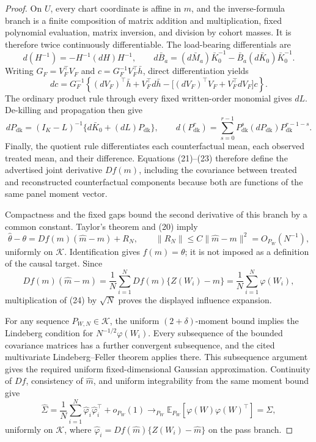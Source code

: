 \documentclass{article}
\begin{document}
\begin{proof}
On \(U\), every chart coordinate is affine in \(m\), and the inverse-formula branch is a finite composition of matrix addition and multiplication, fixed polynomial evaluation, matrix inversion, and division by cohort masses.  It is therefore twice continuously differentiable.  The load-bearing differentials are
\[
 d(H^{-1})=-H^{-1}(dH)H^{-1},
 \qquad
 d\bar B_a=(d\bar M_a)\bar K_0^{-1}-\bar B_a(d\bar K_0)\bar K_0^{-1}. \tag{21}
\]
Writing \(G_F=V_F^{\top}V_F\) and \(c=G_F^{-1}V_F^{\top}\bar h\), direct differentiation yields
\[
 dc=G_F^{-1}\!\left\{(dV_F)^{\top}\bar h+V_F^{\top}d\bar h
 -\bigl[(dV_F)^{\top}V_F+V_F^{\top}dV_F\bigr]c\right\}.       \tag{22}
\]
The ordinary product rule through every fixed written-order monomial gives \(dL\).  De-killing and propagation then give
\[
 dP_{\mathrm{dk}}=(I_K-L)^{-1}\{d\bar K_0+(dL)P_{\mathrm{dk}}\},
 \qquad
 d(P_{\mathrm{dk}}^r)=\sum_{s=0}^{r-1}P_{\mathrm{dk}}^s(dP_{\mathrm{dk}})P_{\mathrm{dk}}^{r-1-s}. \tag{23}
\]
Finally, the quotient rule differentiates each counterfactual mean, each observed treated mean, and their difference.  Equations (21)--(23) therefore define the advertised joint derivative \(Df(m)\), including the covariance between treated and reconstructed counterfactual components because both are functions of the same panel moment vector.

Compactness and the fixed gaps bound the second derivative of this branch by a common constant.  Taylor's theorem and (20) imply
\[
 \widehat\theta-\theta
 =Df(m)(\widehat m-m)+R_N,
 \qquad
 \|R_N\|\le C\|\widehat m-m\|^2=O_{P_W}(N^{-1}),             \tag{24}
\]
uniformly on \(\mathcal K\).  Identification gives \(f(m)=\theta\); it is not imposed as a definition of the causal target.  Since
\[
 Df(m)(\widehat m-m)=\frac1N\sum_{i=1}^NDf(m)\{Z(W_i)-m\}
 =\frac1N\sum_{i=1}^N\varphi(W_i),                            \tag{25}
\]
multiplication of (24) by \(\sqrt N\) proves the displayed influence expansion.

For any sequence \(P_{W,N}\in\mathcal K\), the uniform \((2+\delta)\)-moment bound implies the Lindeberg condition for \(N^{-1/2}\varphi(W_i)\).  Every subsequence of the bounded covariance matrices has a further convergent subsequence, and the cited multivariate Lindeberg--Feller theorem applies there.  This subsequence argument gives the required uniform fixed-dimensional Gaussian approximation.  Continuity of \(Df\), consistency of \(\widehat m\), and uniform integrability from the same moment bound give
\[
 \widehat\Sigma
 =\frac1N\sum_{i=1}^N\widehat\varphi_i\widehat\varphi_i^{\top}+o_{P_W}(1)
 \longrightarrow_{P_W}\mathbb E_{P_W}[\varphi(W)\varphi(W)^{\top}]=\Sigma, \tag{26}
\]
uniformly on \(\mathcal K\), where \(\widehat\varphi_i=Df(\widehat m)\{Z(W_i)-\widehat m\}\) on the pass branch.


\end{proof}
\end{document}
